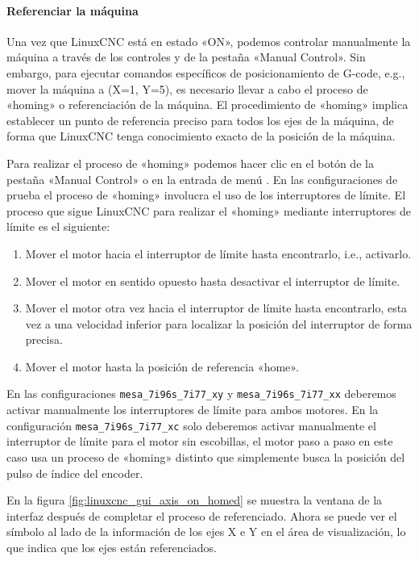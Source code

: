 \documentclass[english,spanish,a4paper,11pt]{article}
\begin{document}
\paragraph{Referenciar la máquina}\hfill\medskip

Una vez que LinuxCNC está en estado «ON», podemos controlar manualmente la máquina a través de los controles \button{-} y \button{+} de la pestaña «Manual Control». Sin embargo, para ejecutar comandos específicos de posicionamiento de G-code, e.g., mover la máquina a (X=1, Y=5), es necesario llevar a cabo el proceso de «homing» o referenciación de la máquina. El procedimiento de «homing» implica establecer un punto de referencia preciso para todos los ejes de la máquina, de forma que LinuxCNC tenga conocimiento exacto de la posición de la máquina.

Para realizar el proceso de «homing» podemos hacer clic en el botón  de la pestaña «Manual Control» o en la entrada de menú . En las configuraciones de prueba el proceso de «homing» involucra el uso de los interruptores de límite. El proceso que sigue LinuxCNC para realizar el «homing» mediante interruptores de límite es el siguiente:
\begin{enumerate}
    \item Mover el motor hacia el interruptor de límite hasta encontrarlo, i.e., activarlo.

    \item Mover el motor en sentido opuesto hasta desactivar el interruptor de límite.

    \item Mover el motor otra vez hacia el interruptor de límite hasta encontrarlo, esta vez a una velocidad inferior para localizar la posición del interruptor de forma precisa.

    \item Mover el motor hasta la posición de referencia «home».
\end{enumerate}
%
En las configuraciones \texttt{mesa\_7i96s\_7i77\_xy} y \texttt{mesa\_7i96s\_7i77\_xx} deberemos activar manualmente los interruptores de límite para ambos motores. En la configuración \texttt{mesa\_7i96s\_7i77\_xc} solo deberemos activar manualmente el interruptor de límite para el motor sin escobillas, el motor paso a paso en este caso usa un proceso de «homing» distinto que simplemente busca la posición del pulso de índice del encoder.

En la figura \cref{fig:linuxcnc_gui_axis_on_homed} se muestra la ventana de la interfaz después de completar el proceso de referenciado. Ahora se puede ver el símbolo  al lado de la información de los ejes X e Y en el área de visualización, lo que indica que los ejes están referenciados.
\end{document}
